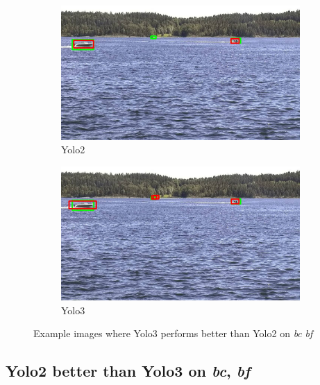 \begin{figure}[h!]
\begin{subfigure}{.5\textwidth}
  \centering
  \includegraphics[width=0.9\linewidth]{results/case_buildings/yolo23/3better/yolo2/selected_06_25_frame0264.jpg}
  \caption{Yolo2}
\end{subfigure}%
\begin{subfigure}{.5\textwidth}
  \centering
  \includegraphics[width=.9\linewidth]{results/case_buildings/yolo23/3better/yolo3/selected_06_25_frame0264.jpg}
  \caption{Yolo3}
\end{subfigure}
\caption{Example images where Yolo3 performs better than Yolo2 on \textit{bc} \textit{bf}}
\label{img:yolo3_better}

\end{figure}

\newpage

\subsection{Yolo2 better than Yolo3 on \textit{bc}, \textit{bf}}
\label{sec:2better}

